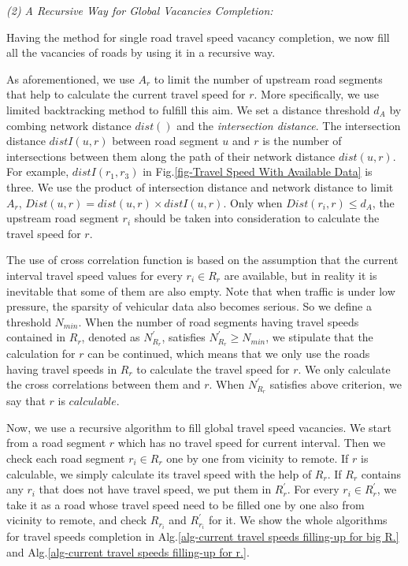 \documentclass[twocolumn,10pt,final,conference]{IEEEtran}
\begin{document}
\emph{(2) A Recursive Way for Global Vacancies Completion:}
\quad

Having the method for single road travel speed vacancy completion, we now fill all the vacancies of roads by using it in a recursive way.

As aforementioned, we use $A_r$ to limit the number of upstream road segments that help to calculate the current travel speed for $r$. More specifically, we use limited backtracking method to fulfill this aim. We set a distance threshold $d_A$ by combing network distance $dist()$ and the \emph{intersection distance}.
The intersection distance $distI(u,r)$ between road segment $u$ and $r$ is the number of intersections between them along the path of their network distance $dist(u,r)$. For example, $distI(r_1,r_3)$ in Fig.\ref{fig-Travel Speed With Available Data} is three.
We use the product of intersection distance and network distance to limit $A_r$, $Dist(u,r)=dist(u,r)\times distI(u,r)$. Only when $Dist(r_i,r)\leqslant d_A$, the upstream road segment $r_i$ should be taken into consideration to calculate the travel speed for $r$.


The use of cross correlation function is based on the assumption that the current interval travel speed values for every $r_i\in R_r$ are available, but in reality it is inevitable that some of them are also empty. Note that when traffic is under low pressure, the sparsity of vehicular data also becomes serious. So we define a threshold $N_{min}$. When the number of road segments having travel speeds contained in $R_r$, denoted as $N_{R_r}^{'}$, satisfies $N_{R_r}^{'} \geqslant N_{min}$, we stipulate that the calculation for $r$ can be continued, which means that we only use the roads having travel speeds in $R_r$ to calculate the travel speed for $r$. We only calculate the cross correlations between them and $r$. When $N_{R_r}^{'}$ satisfies above criterion, we say that $r$ is $calculable$.

Now, we use a recursive algorithm to fill global travel speed vacancies.
We start from a road segment $r$ which has no travel speed for current interval. Then we check each road segment $r_i \in R_r$ one by one from vicinity to remote.
If $r$ is calculable, we simply calculate its travel speed with the help of $R_r$. If $R_r$ contains any $r_i$ that does not have travel speed, we put them in $R_{r}^{'}$. For every $r_i \in R_{r}^{'}$, we take it as a road whose travel speed need to be filled one by one also from vicinity to remote, and check $R_{r_i}$ and $R_{r_i}^{'}$ for it. We show the whole algorithms for travel speeds completion in Alg.\ref{alg-current travel speeds filling-up for big R.} and Alg.\ref{alg-current travel speeds filling-up for r.}.
\end{document}
